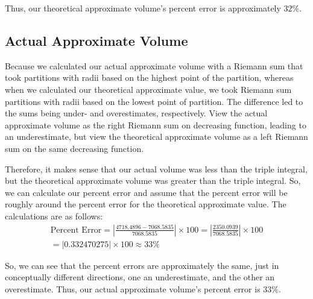 \documentclass[12pt]{article}
\begin{document}
Thus, our theoretical approximate volume's percent error is approximately
$\boxed{32\%}$.

\subsection{Actual Approximate Volume}

Because we calculated our actual approximate volume with a Riemann sum that took
partitions with radii based on the highest point of the partition, whereas when
we calculated our theoretical approximate value, we took Riemann sum partitions
with radii based on the lowest point of partition. The difference led to the
sums being under- and overestimates, respectively. View the actual approximate
volume as the right Riemann sum on decreasing function, leading to an
underestimate, but view the theoretical approximate volume as a left Riemann sum
on the same decreasing function.

Therefore, it makes sense that our actual volume was less than the triple
integral, but the theoretical approximate volume was greater than the triple
integral. So, we can calculate our percent error and assume that the percent
error will be roughly around the percent error for the theoretical approximate
value. The calculations are as follows:
\begin{gather*}
    \text{Percent Error} 
    = \left| \frac{4718.4896 - 7068.5835}{7068.5835} \right| \times 100
    = \left| \frac{2350.0939}{7068.5835} \right| \times 100 \\
    = \left| 0.332470275 \right| \times 100
    \approx 33 \%
\end{gather*}

So, we can see that the percent errors are approximately the same, just in
conceptually different directions, one an underestimate, and the other an
overestimate. Thus, our actual approximate volume's percent error is
$\boxed{33\%}$.
\end{document}

